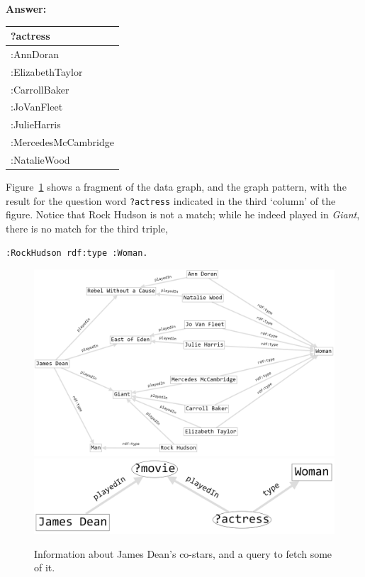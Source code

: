 \textbf{\textbf{Answer:}}

\begin{tabular}{|l|}
\hline
?actress\\
\hline
:AnnDoran\\
:ElizabethTaylor\\
:CarrollBaker\\
:JoVanFleet\\
:JulieHarris\\
:MercedesMcCambridge\\
:NatalieWood\\
\hline
\end{tabular}

Figure~\ref{fig:ch6.4} shows a fragment of the data graph, and the graph pattern,
with the result for the question word \texttt{?actress} indicated in the third
`column' of the figure. Notice that Rock Hudson is not a match; while he
indeed played in \emph{Giant}, there is no match for the third triple,

\begin{lstlisting}
:RockHudson rdf:type :Woman.
\end{lstlisting}

\begin{figure}
\centering
\includegraphics[width=5in]{SWWOv3/media/ch6/figure6-4a.png}
\includegraphics[width=5in]{SWWOv3/media/ch6/figure6-4b.png}
\label{fig:ch6.4}
\caption{Information about James Dean's co-stars, and a query to fetch some of it.}
\end{figure}

